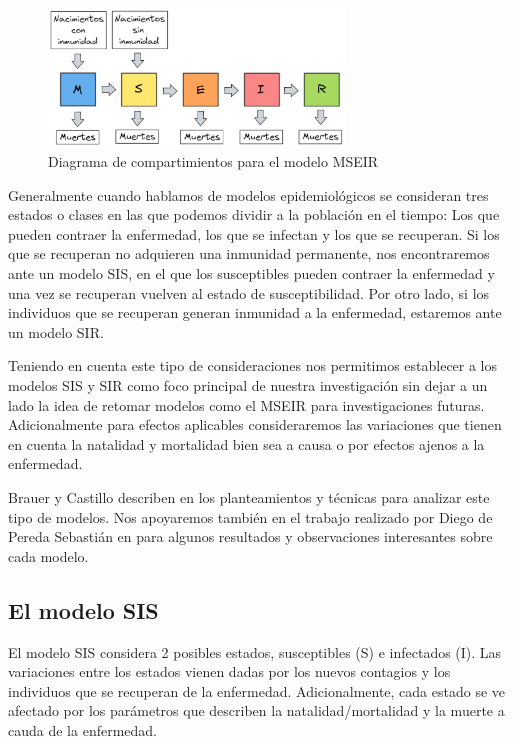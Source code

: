 \begin{figure}[h]
  \centering
    \includegraphics[width=0.7\textwidth]{Imagenes/MSEIR_compatimientos.PNG}
  \caption{Diagrama de compartimientos para el modelo MSEIR}
  \label{fig:diagrama MSEIR}
\end{figure}

Generalmente cuando hablamos de modelos epidemiológicos se consideran tres estados o clases en las que podemos dividir a la población en el tiempo: Los que pueden contraer la enfermedad, los que se infectan y los que se recuperan. Si los que se recuperan no adquieren una inmunidad permanente, nos encontraremos ante un modelo SIS, en el que los susceptibles pueden contraer la enfermedad y una vez se recuperan vuelven al estado de susceptibilidad. Por otro lado, si los individuos que se recuperan generan inmunidad a la enfermedad, estaremos ante un modelo SIR. 

Teniendo en cuenta este tipo de consideraciones nos permitimos establecer a los modelos SIS y SIR como foco principal de nuestra investigación sin dejar a un lado la idea de retomar modelos como el MSEIR para investigaciones futuras. Adicionalmente para efectos aplicables consideraremos las variaciones que tienen en cuenta la natalidad y mortalidad bien sea a causa o por efectos ajenos a la enfermedad.

Brauer y Castillo describen en \cite{mateModelsInPopulationAndEpidemiology} los planteamientos y técnicas para analizar este tipo de modelos. Nos apoyaremos también en el trabajo realizado por Diego de Pereda Sebastián en \cite{diego2010} para algunos resultados y observaciones interesantes sobre cada modelo.

\subsection{El modelo SIS}\label{sub:El modelo SIS}

El modelo SIS considera 2 posibles estados, susceptibles (S) e infectados (I). Las variaciones entre los estados vienen dadas por los nuevos contagios y los individuos que se recuperan de la enfermedad. Adicionalmente, cada estado se ve afectado por los parámetros que describen la natalidad/mortalidad y la muerte a cauda de la enfermedad. 

